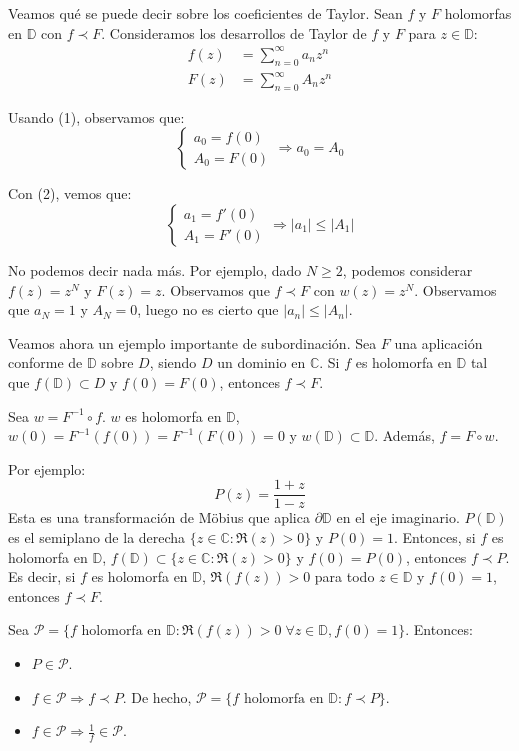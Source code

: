 \begin{remark}
    Veamos qué se puede decir sobre los coeficientes de Taylor.
    Sean $f$ y $F$ holomorfas en $\mathbb{D}$ con $f \prec F$.
    Consideramos los desarrollos de Taylor de $f$ y $F$ para $z \in \mathbb{D}$:
    \begin{align*}
        f(z) & = \sum_{n=0}^\infty a_nz^n \\
        F(z) & = \sum_{n=0}^\infty A_nz^n
    \end{align*}

    Usando (1), observamos que:
    $$\begin{cases}
            a_0 = f(0) \\
            A_0 = F(0)
        \end{cases} \Rightarrow a_0 = A_0$$

    Con (2), vemos que:
    $$\begin{cases}
            a_1 = f'(0) \\
            A_1 = F'(0)
        \end{cases} \Rightarrow |a_1| \leq |A_1|$$

    No podemos decir nada más.
    Por ejemplo, dado $N \geq 2$, podemos considerar $f(z) = z^N$ y $F(z) = z$.
    Observamos que $f \prec F$ con $w(z) = z^N$.
    Observamos que $a_N = 1$ y $A_N = 0$, luego no es cierto que $|a_n| \leq |A_n|$.
\end{remark}

Veamos ahora un ejemplo importante de subordinación.
Sea $F$ una aplicación conforme de $\mathbb{D}$ sobre $D$, siendo $D$ un dominio en $\mathbb{C}$.
Si $f$ es holomorfa en $\mathbb{D}$ tal que $f(\mathbb{D}) \subset D$ y $f(0) = F(0)$, entonces $f \prec F$.

Sea $w = F^{-1} \circ f$.
$w$ es holomorfa en $\mathbb{D}$, $w(0) = F^{-1}(f(0)) = F^{-1}(F(0)) = 0$ y $w(\mathbb{D}) \subset \mathbb{D}$.
Además, $f = F \circ w$.

Por ejemplo:
$$P(z) = \frac{1+z}{1-z}$$
Esta es una transformación de Möbius que aplica $\partial \mathbb{D}$ en el eje imaginario.
$P(\mathbb{D})$ es el semiplano de la derecha $\{z \in \mathbb{C} : \Re(z) > 0\}$ y $P(0) = 1$.
Entonces, si $f$ es holomorfa en $\mathbb{D}$, $f(\mathbb{D}) \subset \{z \in \mathbb{C} : \Re(z) > 0\}$ y $f(0) = P(0)$, entonces $f \prec P$.
Es decir, si $f$ es holomorfa en $\mathbb{D}$, $\Re(f(z)) > 0$ para todo $z \in \mathbb{D}$ y $f(0) = 1$, entonces $f \prec F$.

Sea $\mathcal{P} = \{f \text{ holomorfa en } \mathbb{D} : \Re(f(z)) > 0 \; \forall z \in \mathbb{D}, f(0) = 1\}$.
Entonces:
\begin{itemize}
    \item $P \in \mathcal{P}$.
    \item $f \in \mathcal{P} \Rightarrow f \prec P$.
          De hecho, $\mathcal{P} = \{f \text{ holomorfa en } \mathbb{D} : f \prec P\}$.
    \item $f \in \mathcal{P} \Rightarrow \frac{1}{f} \in \mathcal{P}$.
\end{itemize}

